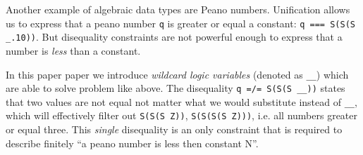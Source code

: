 Another example of algebraic data types are Peano numbers. Unification allows us to express that a peano number \lstinline|q| is greater or equal a constant: \lstinline|q === S(S(S _.10))|$\!\!$.
But disequality constraints are not powerful enough to express that a number is \emph{less} than a constant.

In this paper paper we introduce \emph{wildcard logic variables
} (denoted as \lstinline|__|) which are able to solve problem like above. 
The disequality \lstinline|q =/= S(S(S __))| states that two values are not equal not matter what we would substitute instead of \lstinline|__|, which will effectively filter out \lstinline|S(S(S Z))|, \lstinline|S(S(S(S Z)))|, i.e. all numbers greater or equal three. This \emph{single} disequality is an only constraint that is required  to describe  finitely ``a peano number is less then constant N''.


